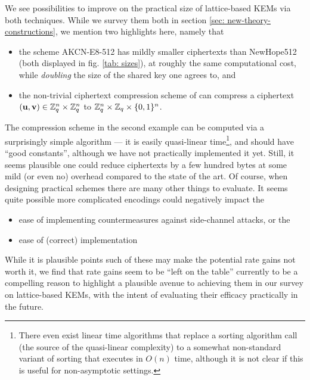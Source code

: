 We see possibilities to improve on the practical size of lattice-based KEMs via both techniques.
While we survey them both in section \ref{sec: new-theory-constructions}, we mention two highlights here, namely that

\begin{itemize}
	\item the scheme AKCN-E8-512 has mildly smaller ciphertexts than NewHope512 (both displayed in fig. \ref{tab: sizes}), at roughly the same computational cost, while \emph{doubling} the size of the shared key one agrees to, and
	\item the non-trivial ciphertext compression scheme of \cite{TCC:BDGM19} can compress a ciphertext $(\mathbf{u}, \mathbf{v})\in\mathbb{Z}_q^n\times \mathbb{Z}_q^n$ to $\mathbb{Z}_q^n\times \mathbb{Z}_q \times \{0,1\}^n$.
\end{itemize}

The compression scheme in the second example can be computed via a surprisingly simple algorithm --- it is easily quasi-linear time\footnote{There even exist linear time algorithms that replace a sorting algorithm call (the source of the quasi-linear complexity) to a somewhat non-standard variant of sorting that executes in $O(n)$ time, although it is not clear if this is useful for non-asymptotic settings.}, and should have ``good constants'', although we have not practically implemented it yet.
Still, it seems plausible one could reduce ciphertexts by a few hundred bytes at some mild (or even no) overhead compared to the state of the art.
Of course, when designing practical schemes there are many other things to evaluate.
It seems quite possible more complicated encodings could negatively impact the
\begin{itemize}
\item ease of implementing countermeasures against side-channel attacks, or the
\item ease of (correct) implementation
\end{itemize}
While it is plausible points such of these may make the potential rate gains not worth it, we find that rate gains seem to be ``left on the table'' currently to be a compelling reason to highlight a plausible avenue to achieving them in our survey on lattice-based KEMs, with the intent of evaluating their efficacy practically in the future.